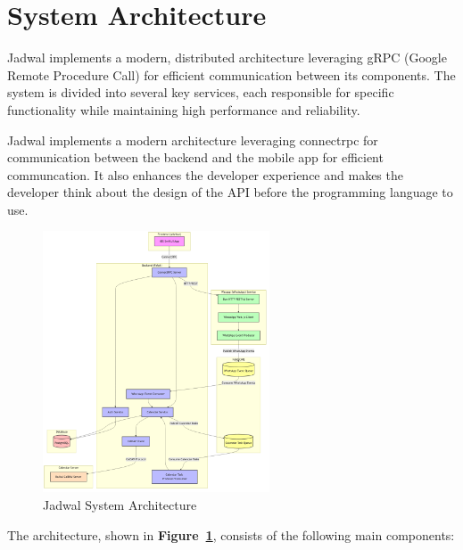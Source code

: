 \section{System Architecture}

Jadwal implements a modern, distributed architecture leveraging gRPC (Google Remote Procedure Call) for efficient communication between its components. The system is divided into several key services, each responsible for specific functionality while maintaining high performance and reliability.

Jadwal implements a modern architecture leveraging \gls{connectrpc} for communication between the backend and the mobile app for efficient communcation. It also enhances the developer experience and makes the developer think about the design of the API before the programming language to use.

\begin{figure}[!h]
    \centering
    \includegraphics[width=0.6\textwidth]{images/architecture.png}
    \caption{Jadwal System Architecture}
    \label{fig:architecture}
\end{figure}

The architecture, shown in \textbf{Figure~\ref{fig:architecture}}, consists of the following main components:

